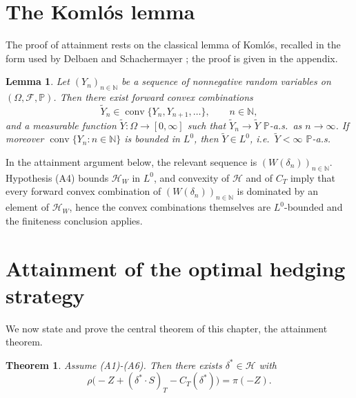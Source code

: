 \documentclass[11pt,a4paper]{report}
\numberwithin{equation}{chapter}
\theoremstyle{plain}
\newtheorem{lemma}[proposition]{Lemma}
\newtheorem{theorem}[proposition]{Theorem}
\theoremstyle{definition}
\newcommand{\PP}{\mathbb{P}}
\newcommand{\N}{\mathbb{N}}
\newcommand{\F}{\mathcal{F}}
\newcommand{\HH}{\mathcal{H}}
\begin{document}
\section{The Koml\'os lemma}

The proof of attainment rests on the classical lemma of Koml\'os, recalled in the form used by Delbaen and Schachermayer \cite[Lemma~A1.1]{delbaenschachermayer}; the proof is given in the appendix.

\begin{lemma}\label{lem:komlos}
    Let $(Y_n)_{n\in\N}$ be a sequence of nonnegative random variables on $(\Omega,\F,\PP)$. Then there exist forward convex combinations
    \[
        \widetilde Y_n\in\operatorname{conv}\{Y_n,Y_{n+1},\dots\},\qquad n\in\N,
    \]
    and a measurable function $\widetilde Y\colon\Omega\to[0,\infty]$ such that $\widetilde Y_n\to\widetilde Y$ $\PP$-a.s.\ as $n\to\infty$. If moreover $\operatorname{conv}\{Y_n:n\in\N\}$ is bounded in $L^0$, then $\widetilde Y\in L^0$, i.e.\ $\widetilde Y<\infty$ $\PP$-a.s.
\end{lemma}

In the attainment argument below, the relevant sequence is $(W(\delta_n))_{n\in\N}$. Hypothesis (A4) bounds $\HH_W$ in $L^0$, and convexity of $\HH$ and of $C_T$ imply that every forward convex combination of $(W(\delta_n))_{n\in\N}$ is dominated by an element of $\HH_W$, hence the convex combinations themselves are $L^0$-bounded and the finiteness conclusion applies.

\section{Attainment of the optimal hedging strategy}\label{sec:attainment}

We now state and prove the central theorem of this chapter, the attainment theorem.

\begin{theorem}\label{thm:attainment}
    Assume \textup{(A1)}-\textup{(A6)}. Then there exists $\delta^*\in\HH$ with
    \[
        \rho\bigl(-Z+(\delta^*\cdot S)_T-C_T(\delta^*)\bigr)=\pi(-Z).
    \]
\end{theorem}
\end{document}
